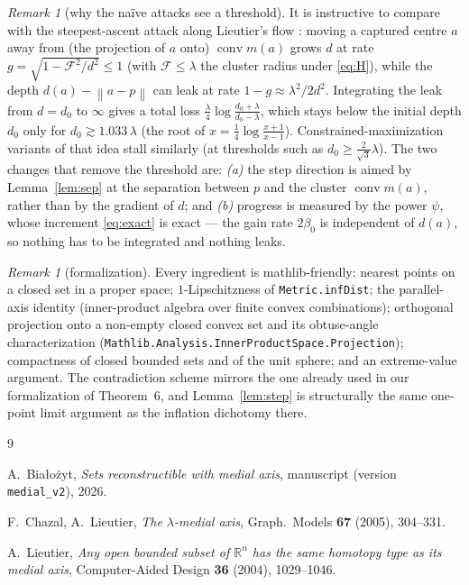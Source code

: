 \documentclass[11pt]{article}
\theoremstyle{remark}
\newtheorem{remark}[theorem]{Remark}
\newcommand{\R}{\mathbb{R}}
\newcommand{\conv}{\operatorname{conv}}
\newcommand{\norm}[1]{\left\lVert #1\right\rVert}
\begin{document}
\begin{remark}[why the na\"ive attacks see a threshold]
It is instructive to compare with the steepest-ascent attack along Lieutier's flow
\cite{Lie}: moving a captured centre $a$ away from (the projection of $a$ onto)
$\conv m(a)$ grows $d$ at rate $g=\sqrt{1-\mathcal F^2/d^2}\le 1$ (with $\mathcal F\le\lambda$
the cluster radius under \eqref{eq:H}), while the depth $d(a)-\norm{a-p}$ can leak at rate
$1-g\approx \lambda^2/2d^2$. Integrating the leak from $d=d_0$ to $\infty$ gives a total loss
$\tfrac{\lambda}{4}\log\frac{d_0+\lambda}{d_0-\lambda}$, which stays below the initial depth
$d_0$ only for $d_0\gtrsim 1.033\,\lambda$ (the root of
$x=\tfrac14\log\frac{x+1}{x-1}$). Constrained-maximization variants of that idea stall
similarly (at thresholds such as $d_0\ge\tfrac{2}{\sqrt3}\lambda$). The two changes that remove
the threshold are: \emph{(a)} the step direction is aimed by Lemma~\ref{lem:sep} at the
separation between $p$ and the cluster $\conv m(a)$, rather than by the gradient of $d$; and
\emph{(b)} progress is measured by the power $\psi$, whose increment \eqref{eq:exact} is exact
--- the gain rate $2\beta_0$ is independent of $d(a)$, so nothing has to be integrated and
nothing leaks.
\end{remark}

\begin{remark}[formalization]
Every ingredient is mathlib-friendly: nearest points on a closed set in a proper space;
$1$-Lipschitzness of \texttt{Metric.infDist}; the parallel-axis identity (inner-product
algebra over finite convex combinations); orthogonal projection onto a non-empty closed convex
set and its obtuse-angle characterization
(\texttt{Mathlib.Analysis.InnerProductSpace.Projection}); compactness of closed bounded sets
and of the unit sphere; and an extreme-value argument. The contradiction scheme mirrors the
one already used in our formalization of Theorem~6, and Lemma~\ref{lem:step} is structurally
the same one-point limit argument as the inflation dichotomy there.
\end{remark}

\begin{thebibliography}{9}

 A.~Bia{\l}o\.zyt,
\emph{Sets reconstructible with medial axis}, manuscript (version \texttt{medial\_v2}), 2026.

 F.~Chazal, A.~Lieutier,
\emph{The $\lambda$-medial axis}, Graph.\ Models \textbf{67} (2005), 304--331.

 A.~Lieutier,
\emph{Any open bounded subset of $\R^n$ has the same homotopy type as its medial axis},
Computer-Aided Design \textbf{36} (2004), 1029--1046.

\end{thebibliography}
\end{document}
